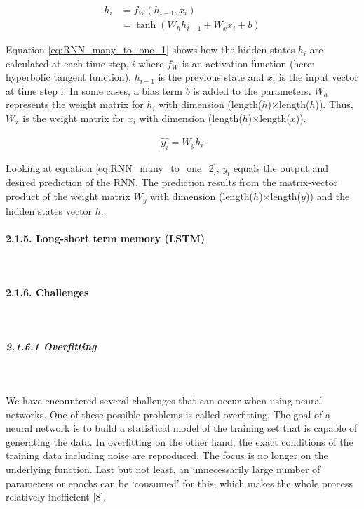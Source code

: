 \documentclass[
]{article}
\begin{document}
\begin{align} \label{eq:RNN_many_to_one_1}
  h_{i} & = f_{W}(h_{i-1}, x_{i}) \\
  & = \tanh(W_{h}h_{i-1} + W_{x}x_{i} + b) \nonumber 
\end{align}

Equation \ref{eq:RNN_many_to_one_1} shows how the hidden states
\(h_{i}\) are calculated at each time step, \(i\) where \(f_{W}\) is an
activation function (here: hyperbolic tangent function), \(h_{i-1}\) is
the previous state and \(x_i\) is the input vector at time step i. In
some cases, a bias term \(b\) is added to the parameters. \(W_{h}\)
represents the weight matrix for \(h_{i}\) with dimension
(length(\(h\))\(\times\)length(\(h\))). Thus, \(W_{x}\) is the weight
matrix for \(x_{i}\) with dimension
(length(\(h\))\(\times\)length(\(x\))).

\begin{align} \label{eq:RNN_many_to_one_2}
  \hat{y_{i}} = W_{y}h_{i}
\end{align}

Looking at equation \ref{eq:RNN_many_to_one_2}, \(y_{i}\) equals the
output and desired prediction of the RNN. The prediction results from
the matrix-vector product of the weight matrix \(W_{y}\) with dimension
(length(\(h\))\(\times\)length(\(y\))) and the hidden states vector
\(h\).

\hypertarget{LSTM}{%
\paragraph{2.1.5. Long-short term memory (LSTM)}\label{LSTM}}

~

\hypertarget{challenges}{%
\paragraph{2.1.6. Challenges}\label{challenges}}

~

\hypertarget{overfitting}{%
\subparagraph{2.1.6.1 Overfitting}\label{overfitting}}

~

We have encountered several challenges that can occur when using neural
networks. One of these possible problems is called overfitting. The goal
of a neural network is to build a statistical model of the training set
that is capable of generating the data. In overfitting on the other
hand, the exact conditions of the training data including noise are
reproduced. The focus is no longer on the underlying function. Last but
not least, an unnecessarily large number of parameters or epochs can be
`consumed' for this, which makes the whole process relatively
inefficient {[}8{]}.
\end{document}
